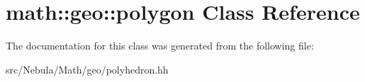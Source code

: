 \hypertarget{classmath_1_1geo_1_1polygon}{\section{math\-:\-:geo\-:\-:polygon Class Reference}
\label{classmath_1_1geo_1_1polygon}
}


The documentation for this class was generated from the following file\-:\begin{DoxyCompactItemize}
\item 
src/\-Nebula/\-Math/geo/polyhedron.\-hh\end{DoxyCompactItemize}
